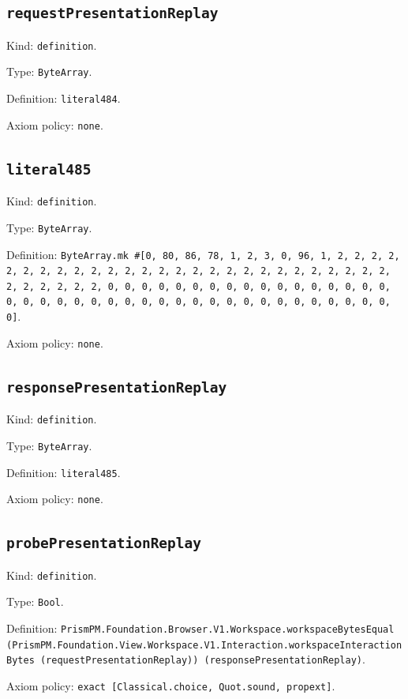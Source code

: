 \documentclass[11pt]{article}
\begin{document}
\subsection*{\texttt{requestPresentationReplay}}
\noindent Kind: \texttt{definition}.\par
\noindent Type: \texttt{ByteArray}.\par
\noindent Definition: \texttt{literal484}.\par
\noindent Axiom policy: \texttt{none}.\par
\subsection*{\texttt{literal485}}
\noindent Kind: \texttt{definition}.\par
\noindent Type: \texttt{ByteArray}.\par
\noindent Definition: \texttt{ByteArray.mk \#[0, 80, 86, 78, 1, 2, 3, 0, 96, 1, 2, 2, 2, 2, 2, 2, 2, 2, 2, 2, 2, 2, 2, 2, 2, 2, 2, 2, 2, 2, 2, 2, 2, 2, 2, 2, 2, 2, 2, 2, 2, 2, 2, 0, 0, 0, 0, 0, 0, 0, 0, 0, 0, 0, 0, 0, 0, 0, 0, 0, 0, 0, 0, 0, 0, 0, 0, 0, 0, 0, 0, 0, 0, 0, 0, 0, 0, 0, 0, 0, 0, 0, 0, 0]}.\par
\noindent Axiom policy: \texttt{none}.\par
\subsection*{\texttt{responsePresentationReplay}}
\noindent Kind: \texttt{definition}.\par
\noindent Type: \texttt{ByteArray}.\par
\noindent Definition: \texttt{literal485}.\par
\noindent Axiom policy: \texttt{none}.\par
\subsection*{\texttt{probePresentationReplay}}
\noindent Kind: \texttt{definition}.\par
\noindent Type: \texttt{Bool}.\par
\noindent Definition: \texttt{PrismPM.Foundation.Browser.V1.Workspace.workspaceBytesEqual (PrismPM.Foundation.View.Workspace.V1.Interaction.workspaceInteractionBytes (requestPresentationReplay)) (responsePresentationReplay)}.\par
\noindent Axiom policy: \texttt{exact [Classical.choice, Quot.sound, propext]}.\par
\end{document}
